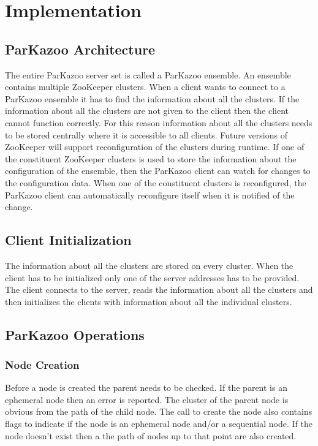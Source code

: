 \chapter{Implementation}

\section{ParKazoo Architecture}
  The entire ParKazoo server set is called a ParKazoo ensemble. An ensemble contains multiple ZooKeeper clusters. When a client wants to connect to a ParKazoo ensemble it has to find the information about all the clusters. If the information about all the clusters are not given to the client then the client cannot function correctly. For this reason information about all the clusters needs to be stored centrally where it is accessible to all clients. Future versions of ZooKeeper will support reconfiguration of the clusters during runtime. If one of the constituent ZooKeeper clusters is used to store the information about the configuration of the ensemble, then the ParKazoo client can watch for changes to the configuration data. When one of the constituent clusters is reconfigured, the ParKazoo client can automatically reconfigure itself when it is notified of the change. 

\addvspace{1em}

\addvspace{1em}
  
\section{Client Initialization}
    The information about all the clusters are stored on every cluster. When the client has to be initialized only one of the server addresses has to be provided. The client connects to the server, reads the information about all the clusters and then initializes the clients with information about all the individual clusters.

\section{ParKazoo Operations}


\subsection{Node Creation}
Before a node is created the parent needs to be checked. If the parent is an ephemeral node then an error is reported. The cluster of the parent node is obvious from the path of the child node. The call to create the node also contains flags to indicate if the node is an ephemeral node and/or a sequential node. If the node doesn't exist then a the path of nodes up to that point are also created.

